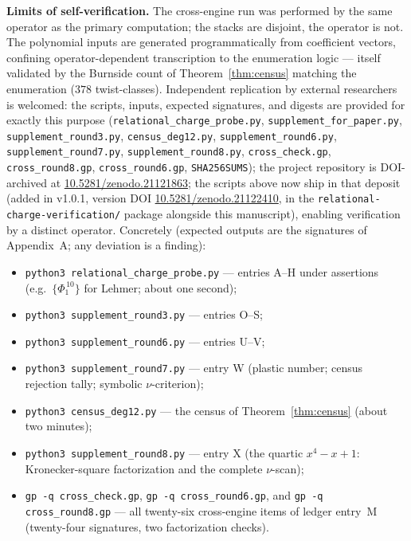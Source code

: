 \documentclass[11pt]{article}
\theoremstyle{plain}
\theoremstyle{definition}
\theoremstyle{remark}
\begin{document}
\textbf{Limits of self-verification.} The cross-engine run was performed by
the same operator as the primary computation; the stacks are disjoint, the
operator is not. The polynomial inputs are generated programmatically from
coefficient vectors, confining operator-dependent transcription to the
enumeration logic --- itself validated by the Burnside count of
Theorem~\ref{thm:census} matching the enumeration ($378$ twist-classes).
Independent replication by external researchers is welcomed:
the scripts, inputs, expected signatures, and digests are provided for
exactly this purpose (\texttt{relational\_charge\_probe.py},
\texttt{supplement\_for\_paper.py}, \texttt{supplement\_round3.py},
\texttt{census\_deg12.py}, \texttt{supplement\_round6.py},
\texttt{supplement\_round7.py}, \texttt{supplement\_round8.py},
\texttt{cross\_check.gp}, \texttt{cross\_round8.gp},
\texttt{cross\_round6.gp}, \texttt{SHA256SUMS}); the project repository is DOI-archived at
\url{10.5281/zenodo.21121863}; the scripts above now ship in that deposit
(added in v1.0.1, version DOI \url{10.5281/zenodo.21122410}, in the
\texttt{relational-charge-verification/} package alongside this
manuscript), enabling verification by a distinct operator. Concretely (expected
outputs are the signatures of Appendix~A; any deviation is a finding):
\begin{itemize}
\item \texttt{python3 relational\_charge\_probe.py} --- entries A--H under
assertions (e.g.\ $\{\Phi_1^{\,10}\}$ for Lehmer; about one second);
\item \texttt{python3 supplement\_round3.py} --- entries O--S;
\item \texttt{python3 supplement\_round6.py} --- entries U--V;
\item \texttt{python3 supplement\_round7.py} --- entry W (plastic number;
census rejection tally; symbolic $\nu$-criterion);
\item \texttt{python3 census\_deg12.py} --- the census of
Theorem~\ref{thm:census} (about two minutes);
\item \texttt{python3 supplement\_round8.py} --- entry X (the quartic
$x^4-x+1$: Kronecker-square factorization and the complete $\nu$-scan);
\item \texttt{gp -q cross\_check.gp}, \texttt{gp -q cross\_round6.gp}, and
\texttt{gp -q cross\_round8.gp}
--- all twenty-six cross-engine items of ledger entry~M
(twenty-four signatures, two factorization checks).
\end{itemize}
\end{document}
